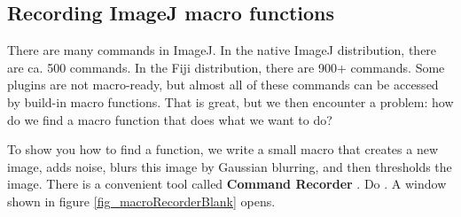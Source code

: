 \subsection{Recording ImageJ macro functions}
There are many commands in ImageJ. In the native ImageJ distribution, there are ca. 500 commands. In the Fiji distribution, there are 900+ commands. Some plugins are not macro-ready, but almost all of these commands can be accessed by build-in macro functions. That is great, but we then encounter a problem: how do we find a macro function that does what we want to do?

To show you how to find a function, we write a small macro that creates a new image, adds noise, blurs this image by Gaussian blurring, and then thresholds the image. There is a convenient tool called \textbf{Command Recorder} . 
Do . A window shown in figure
\ref{fig_macroRecorderBlank} opens.